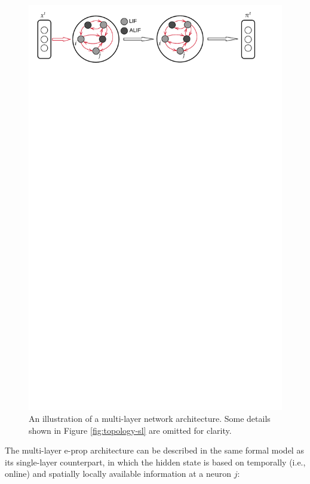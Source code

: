 		\begin{figure}[!ht]
		    \myfloatalign
		    \includegraphics[trim=0 25cm 0 0, clip, width=\linewidth]{gfx/Multilayer}
		    \caption[Multi-layer illustration]{An illustration of a multi-layer network architecture. Some details shown in Figure \ref{fig:topology-sl} are omitted for clarity.}
		    \label{fig:topology-ml}
		  \end{figure}

		The multi-layer e-prop architecture can be described in the same formal model as its single-layer counterpart, in which the hidden state is based on temporally (i.e., online) and spatially locally available information at a neuron $j$:

